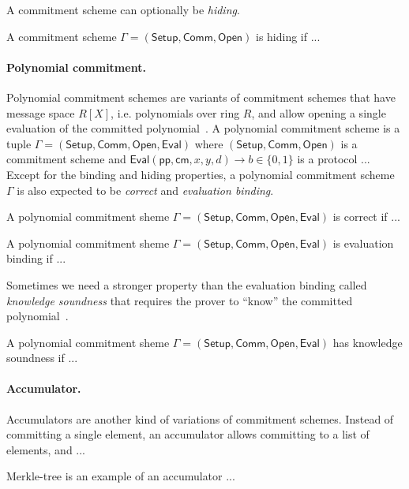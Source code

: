 \documentclass[acmtog]{acmart}
\newcommand{\Setup}{\mathsf{Setup}}
\newcommand{\Comm}{\mathsf{Comm}}
\newcommand{\Open}{\mathsf{Open}}
\newcommand{\Eval}{\mathsf{Eval}}
\newcommand{\pp}{\mathsf{pp}}
\newcommand{\cm}{\mathsf{cm}}
\begin{document}
A commitment scheme can optionally be \emph{hiding}.

\begin{definition}[Hiding]
A commitment scheme $\Gamma=(\Setup,\Comm,\Open)$ is hiding if ...
\end{definition}

\paragraph{Polynomial commitment.} Polynomial commitment schemes are variants of commitment schemes that have message space $R[X]$, i.e. polynomials over ring $R$, and allow opening a single evaluation of the committed polynomial~\cite{KateZG10}.
A polynomial commitment scheme is a tuple $\Gamma=(\Setup,\Comm,\Open,\Eval)$ where $(\Setup,\Comm,\Open)$ is a commitment scheme and $\Eval(\pp,\cm,x,y,d)\to b\in\{0,1\}$ is a protocol ...
Except for the binding and hiding properties, a polynomial commitment scheme $\Gamma$ is also expected to be \emph{correct} and \emph{evaluation binding}.

\begin{definition}[Correct]
A polynomial commitment sheme $\Gamma=(\Setup,\Comm,\Open,\Eval)$ is correct if ...
\end{definition}

\begin{definition}
A polynomial commitment sheme $\Gamma=(\Setup,\Comm,\Open,\Eval)$ is evaluation binding if ...
\end{definition}

Sometimes we need a stronger property than the evaluation binding called \emph{knowledge soundness} that requires the prover to ``know'' the committed polynomial~\cite{BunzFS20}.

\begin{definition}
A polynomial commitment sheme $\Gamma=(\Setup,\Comm,\Open,\Eval)$ has knowledge soundness if ...
\end{definition}

\paragraph{Accumulator.}
Accumulators are another kind of variations of commitment schemes.
Instead of committing a single element, an accumulator allows committing to a list of elements, and ...

Merkle-tree is an example of an accumulator ...
\end{document}
